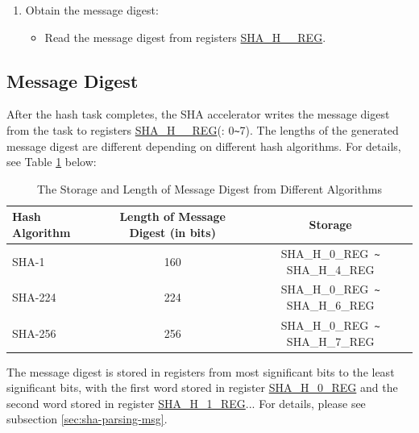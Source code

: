 \documentclass[main\_\_EN.tex]{subfiles}
\begin{document}
\begin{enumerate}
    \item Obtain the message digest:
    \begin{itemize}
        \item Read the message digest from registers \hyperref[regdesc:SHAHNREG]{SHA\_H\_\_REG}.
    \end{itemize}
\end{enumerate}

\subsection{Message Digest}

After the hash task completes, the SHA accelerator writes the message digest from the task to registers \hyperref[regdesc:SHAHNREG]{SHA\_H\_\_REG}(: 0\verb+~+7). The lengths of the generated message digest are different depending on different hash algorithms. For details, see Table \ref{tab:sha-message-digest} below:


\begin{table}[H]
    \centering
    \caption{The Storage and Length of Message Digest from Different Algorithms}
    \label{tab:sha-message-digest}
    \begin{threeparttable}
    \begin{tabular}{ | l | c | c |}
    \hline
        \rowcolor{lightgray}
        \textbf{Hash Algorithm} & \textbf{Length of Message Digest (in bits)} & \textbf{Storage\tnote{1}} \\\hline
        SHA-1 & 160 & SHA\_H\_0\_REG\verb+ ~ +SHA\_H\_4\_REG \\\hline
        SHA-224 & 224 & SHA\_H\_0\_REG\verb+ ~ +SHA\_H\_6\_REG \\\hline  
        SHA-256 & 256 & SHA\_H\_0\_REG\verb+ ~ +SHA\_H\_7\_REG \\\hline
    \end{tabular}

    \begin{tablenotes}
        \item[1] The message digest is stored in registers from most significant bits to the least significant bits, with the first word stored in register \hyperref[regdesc:SHAHNREG]{SHA\_H\_0\_REG} and the second word stored in register \hyperref[regdesc:SHAHNREG]{SHA\_H\_1\_REG}... For details, please see subsection \ref{sec:sha-parsing-msg}.
    \end{tablenotes}

    \end{threeparttable}
\end{table}
\end{document}
